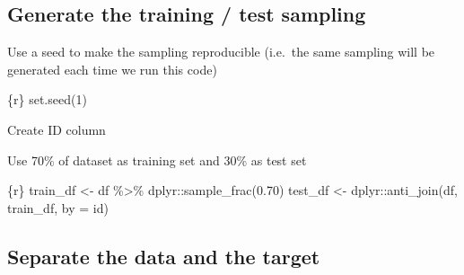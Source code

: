 \documentclass[
  letterpaper,
  DIV=11,
  numbers=noendperiod,
  oneside]{scrreprt}
\newenvironment{Shaded}{\begin{snugshade}}{\end{snugshade}}
\newcommand{\AttributeTok}[1]{\textcolor[rgb]{0.40,0.45,0.13}{#1}}
\newcommand{\DecValTok}[1]{\textcolor[rgb]{0.68,0.00,0.00}{#1}}
\newcommand{\FloatTok}[1]{\textcolor[rgb]{0.68,0.00,0.00}{#1}}
\newcommand{\FunctionTok}[1]{\textcolor[rgb]{0.28,0.35,0.67}{#1}}
\newcommand{\InformationTok}[1]{\textcolor[rgb]{0.37,0.37,0.37}{#1}}
\newcommand{\NormalTok}[1]{\textcolor[rgb]{0.00,0.23,0.31}{#1}}
\newcommand{\OtherTok}[1]{\textcolor[rgb]{0.00,0.23,0.31}{#1}}
\newcommand{\SpecialCharTok}[1]{\textcolor[rgb]{0.37,0.37,0.37}{#1}}
\newcommand{\StringTok}[1]{\textcolor[rgb]{0.13,0.47,0.30}{#1}}
\begin{document}
\hypertarget{generate-the-training-test-sampling}{%
\subsection{Generate the training / test
sampling}\label{generate-the-training-test-sampling}}

Use a seed to make the sampling reproducible (i.e.~the same sampling
will be generated each time we run this code)

\begin{Shaded}
\begin{Highlighting}[]
\InformationTok{\textasciigrave{}\textasciigrave{}\textasciigrave{}\{r\}}
\FunctionTok{set.seed}\NormalTok{(}\DecValTok{1}\NormalTok{)}
\InformationTok{\textasciigrave{}\textasciigrave{}\textasciigrave{}}
\end{Highlighting}
\end{Shaded}

Create ID column

\begin{Shaded}
\end{Shaded}

Use 70\% of dataset as training set and 30\% as test set

\begin{Shaded}
\begin{Highlighting}[]
\InformationTok{\textasciigrave{}\textasciigrave{}\textasciigrave{}\{r\}}
\NormalTok{train\_df }\OtherTok{\textless{}{-}}\NormalTok{ df }\SpecialCharTok{\%\textgreater{}\%}
\NormalTok{  dplyr}\SpecialCharTok{::}\FunctionTok{sample\_frac}\NormalTok{(}\FloatTok{0.70}\NormalTok{)}
\NormalTok{test\_df  }\OtherTok{\textless{}{-}}\NormalTok{ dplyr}\SpecialCharTok{::}\FunctionTok{anti\_join}\NormalTok{(df,}
\NormalTok{                             train\_df,}
                             \AttributeTok{by =} \StringTok{\textquotesingle{}id\textquotesingle{}}\NormalTok{)}
\InformationTok{\textasciigrave{}\textasciigrave{}\textasciigrave{}}
\end{Highlighting}
\end{Shaded}

\hypertarget{separate-the-data-and-the-target}{%
\subsection{Separate the data and the
target}\label{separate-the-data-and-the-target}}
\end{document}
